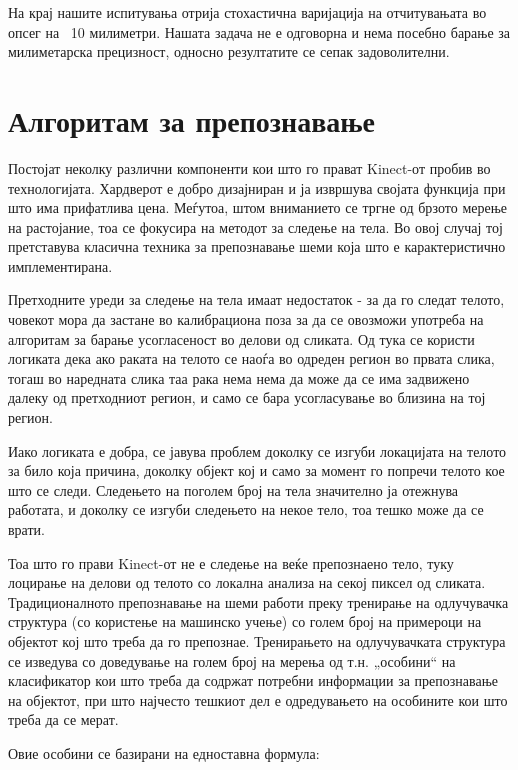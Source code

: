 \documentclass[12pt]{article}
\begin{document}
    На крај нашите испитувања отрија стохастична варијација на отчитувањата во опсег на ~10 милиметри. Нашата задача не е одговорна и нема посебно барање за милиметарска прецизност, односно резултатите се сепак задоволителни.


\newpage

\section{Алгоритам за препознавање}

  Постојат неколку различни компоненти кои што го прават Kinect-от пробив во технологијата. Хардверот е добро дизајниран и ја извршува својата функција при што има прифатлива цена. Меѓутоа, штом вниманието се тргне од брзото мерење на растојание, тоа се фокусира на методот за следење на тела. Во овој случај тој претставува класична техника за препознавање шеми која што е карактеристично имплементирана.\bigbreak

	Претходните уреди за следење на тела имаат недостаток - за да го следат телото, човекот мора да застане во калибрациона поза за да се овозможи употреба на алгоритам за барање усогласеност во делови од сликата. Од тука се користи логиката дека ако раката на телото се наоѓа во одреден регион во првата слика, тогаш во наредната слика таа рака нема нема да може да се има задвижено далеку од претходниот регион, и само се бара усогласување во близина на тој регион.\bigbreak

	Иако логиката е добра, се јавува проблем доколку се изгуби локацијата на телото за било која причина, доколку објект кој и само за момент го попречи телото кое што се следи. Следењето на поголем број на тела значително ја отежнува работата, и доколку се изгуби следењето на некое тело, тоа тешко може да се врати.\bigbreak

	Тоа што го прави Kinect-от не е следење на веќе препознаено тело, туку лоцирање на делови од телото со локална анализа на секој пиксел од сликата. Традиционалното препознавање на шеми работи преку тренирање на одлучувачка структура (со користење на машинско учење) со голем број на примероци на објектот кој што треба да го препознае. Тренирањето на одлучувачката структура се изведува со доведување на голем број на мерења од т.н. „особини“ на класификатор кои што треба да содржат потребни информации за препознавање на објектот, при што најчесто тешкиот дел е одредувањето на особините кои што треба да се мерат.\bigbreak

	Овие особини се базирани на едноставна формула:
\end{document}
